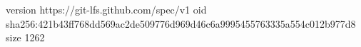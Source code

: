 version https://git-lfs.github.com/spec/v1
oid sha256:421b43ff768dd569ac2de509776d969d46c6a9995455763335a554c012b977d8
size 1262
